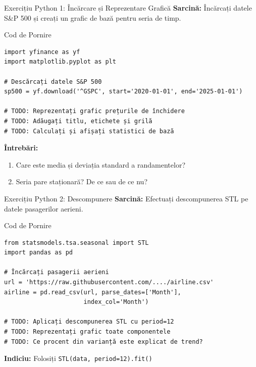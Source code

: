 \documentclass[9pt, aspectratio=169, t]{beamer}
\begin{document}
\begin{frame}[fragile]{Exercițiu Python 1: Încărcare și Reprezentare Grafică}
    \textbf{Sarcină:} Încărcați datele S\&P 500 și creați un grafic de bază pentru seria de timp.

    \vspace{0.3cm}

    \begin{block}{Cod de Pornire}
    \small
    \begin{verbatim}
import yfinance as yf
import matplotlib.pyplot as plt

# Descărcați datele S&P 500
sp500 = yf.download('^GSPC', start='2020-01-01', end='2025-01-01')

# TODO: Reprezentați grafic prețurile de închidere
# TODO: Adăugați titlu, etichete și grilă
# TODO: Calculați și afișați statistici de bază
    \end{verbatim}
    \end{block}

    \vspace{0.2cm}

    \textbf{Întrebări:}
    \begin{enumerate}
        \item Care este media și deviația standard a randamentelor?
        \item Seria pare staționară? De ce sau de ce nu?
    \end{enumerate}
\end{frame}

\begin{frame}[fragile]{Exercițiu Python 2: Descompunere}
    \textbf{Sarcină:} Efectuați descompunerea STL pe datele pasagerilor aerieni.

    \vspace{0.3cm}

    \begin{block}{Cod de Pornire}
    \small
    \begin{verbatim}
from statsmodels.tsa.seasonal import STL
import pandas as pd

# Încărcați pasagerii aerieni
url = 'https://raw.githubusercontent.com/..../airline.csv'
airline = pd.read_csv(url, parse_dates=['Month'],
                      index_col='Month')

# TODO: Aplicați descompunerea STL cu period=12
# TODO: Reprezentați grafic toate componentele
# TODO: Ce procent din varianță este explicat de trend?
    \end{verbatim}
    \end{block}

    \textbf{Indiciu:} Folosiți \texttt{STL(data, period=12).fit()}
\end{frame}
\end{document}
